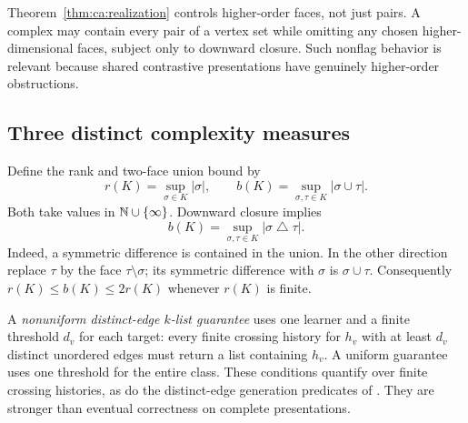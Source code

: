 \begin{remark}
Theorem~\ref{thm:ca:realization} controls higher-order faces, not just pairs. A complex may contain every pair of a vertex set while omitting any chosen higher-dimensional faces, subject only to downward closure. Such nonflag behavior is relevant because shared contrastive presentations have genuinely higher-order obstructions.
\end{remark}

\subsection{Three distinct complexity measures}
Define the rank and two-face union bound by
\[
r(K)=\sup_{\sigma\in K}|\sigma|,
\qquad
b(K)=\sup_{\sigma,\tau\in K}|\sigma\cup\tau|.
\]
Both take values in $\mathbb N\cup\{\infty\}$. Downward closure implies
\begin{equation}\label{eq:ca:symdiff}
b(K)=\sup_{\sigma,\tau\in K}|\sigma\mathbin{\triangle}\tau|.
\end{equation}
Indeed, a symmetric difference is contained in the union. In the other direction replace $\tau$ by the face $\tau\setminus\sigma$; its symmetric difference with $\sigma$ is $\sigma\cup\tau$. Consequently $r(K)\le b(K)\le2r(K)$ whenever $r(K)$ is finite.

A \emph{nonuniform distinct-edge $k$-list guarantee} uses one learner and a finite threshold $d_v$ for each target: every finite crossing history for $h_v$ with at least $d_v$ distinct unordered edges must return a list containing $h_v$. A uniform guarantee uses one threshold for the entire class. These conditions quantify over finite crossing histories, as do the distinct-edge generation predicates of \citet{P28}. They are stronger than eventual correctness on complete presentations.

